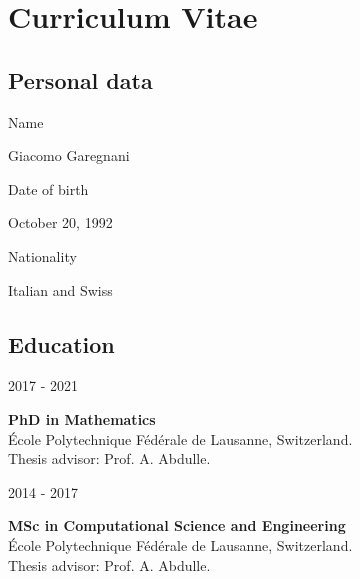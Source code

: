 \cleardoublepage
\thispagestyle{empty}

\chapter{Curriculum Vitae}

\section*{Personal data}
\begin{minipage}[t]{0.2\linewidth}
	Name
\end{minipage}
\begin{minipage}[t]{0.8\linewidth}
	Giacomo Garegnani
\end{minipage}
\begin{minipage}[t]{0.2\linewidth}
	Date of birth
\end{minipage}
\begin{minipage}[t]{0.8\linewidth}
	October 20, 1992
\end{minipage}
\begin{minipage}[t]{0.2\linewidth}
	Nationality
\end{minipage}
\begin{minipage}[t]{0.8\linewidth}
	Italian and Swiss
\end{minipage}

\section*{Education}
\begin{minipage}{0.2\linewidth}
	2017 - 2021
\end{minipage}
\begin{minipage}[t]{0.8\linewidth}
	\textbf{PhD in Mathematics}\\
	École Polytechnique Fédérale de Lausanne, Switzerland.\\
	Thesis advisor: Prof. A. Abdulle.
\end{minipage}

\begin{minipage}{0.2\linewidth}
	2014 - 2017
\end{minipage}
\begin{minipage}[t]{0.8\linewidth}
	\textbf{MSc in Computational Science and Engineering}\\
	École Polytechnique Fédérale de Lausanne, Switzerland.\\
	Thesis advisor: Prof. A. Abdulle.
\end{minipage}

